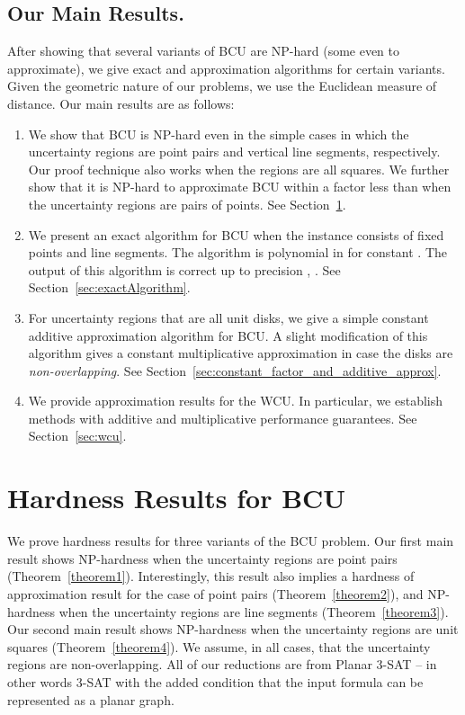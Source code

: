 \subsection{Our Main Results.}
After showing that several variants of BCU are NP-hard (some even to approximate), we give exact and approximation algorithms for certain variants.
Given the geometric nature of our problems, we use the Euclidean measure of distance.
Our main results are as follows:
\begin{enumerate}
\item
We show that BCU is NP-hard even in the simple cases in which the uncertainty regions are point pairs and vertical line segments, respectively.
Our proof technique also works when the regions are all squares.
We further show that it is NP-hard to approximate BCU within a factor less than  when the uncertainty regions are pairs of points.
See Section~\ref{sec:hardness}.
\item
We present an exact algorithm for BCU when the instance consists of  fixed points and  line segments. The algorithm is polynomial in  for constant . The output of this algorithm is correct up to precision , . See Section~\ref{sec:exactAlgorithm}.
\item
For uncertainty regions that are all unit disks, we give a simple constant additive approximation algorithm for BCU. A slight modification of this algorithm gives a constant multiplicative approximation in case the disks are \emph{non-overlapping}. See Section~\ref{sec:constant_factor_and_additive_approx}.
\item
We provide approximation results for the WCU. In particular, we establish methods with additive and multiplicative performance guarantees. See Section~\ref{sec:wcu}.
\end{enumerate}
 

\makeatletter{}\section{Hardness Results for BCU} \label{sec:hardness}

We prove hardness results for three variants of the BCU problem. Our first main result shows NP-hardness when the uncertainty regions are point pairs (Theorem~\ref{theorem1}). Interestingly,  this result also implies a hardness of approximation result for the case of point pairs  (Theorem~\ref{theorem2}), and NP-hardness when the uncertainty regions are line segments  (Theorem~\ref{theorem3}). Our second main result shows NP-hardness when the uncertainty regions are unit squares (Theorem~\ref{theorem4}).  We assume, in all cases, that the uncertainty regions are non-overlapping.  All of our reductions are from Planar 3-SAT -- in other words 3-SAT with the added condition that the input formula can be represented as a planar graph.


